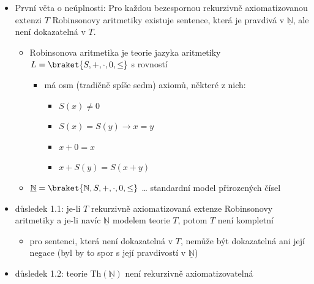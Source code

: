 \begin{itemize}
\begin{itemize}
\begin{itemize}
\begin{itemize}
\item $T=\set{p_u\to\neg p_v\mid\set{u,v}\in E(G)}$
\end{itemize}
\item nestandardní model přirozených čísel
\begin{itemize}
\item vezmeme standardní model přirozených čísel (jeho teorii)
\item přidáme nový konstantní symbol
\item přidáme k teorii výrok, že je ta konstanta ostře větší než každý $n$-tý numerál
\item každá konečná část této nové teorie má model, takže i celá ta nová teorie má model
\end{itemize}
\end{itemize}
\item První věta o neúplnosti: Pro každou bezespornou rekurzivně axiomatizovanou extenzi $T$ Robinsonovy aritmetiky existuje sentence, která je pravdivá v $\underline{\mathbb N}$, ale není dokazatelná v $T$.
\begin{itemize}
\item Robinsonova aritmetika je teorie jazyka aritmetiky $L=\braket{S,+,\cdot,0,\leq}$ s rovností
\begin{itemize}
\item má osm (tradičně spíše sedm) axiomů, některé z nich:
\begin{itemize}
\item $S(x)\neq 0$
\item $S(x)=S(y)\to x=y$
\item $x+0=x$
\item $x+S(y)=S(x+y)$
\end{itemize}
\end{itemize}
\item $\underline{\mathbb N}=\braket{\mathbb N,S,+,\cdot,0,\leq}$ \dots{} standardní model přirozených čísel
\end{itemize}
\item důsledek 1.1: je-li $T$ rekurzivně axiomatizovaná extenze Robinsonovy aritmetiky a je-li navíc $\underline{\mathbb N}$ modelem teorie $T$, potom $T$ není kompletní
\begin{itemize}
\item pro sentenci, která není dokazatelná v $T$, nemůže být dokazatelná ani její negace (byl by to spor s její pravdivostí v $\underline{\mathbb N}$)
\end{itemize}
\item důsledek 1.2: teorie $\text{Th}(\underline{\mathbb N})$ není rekurzivně axiomatizovatelná

\end{itemize}
\end{itemize}
